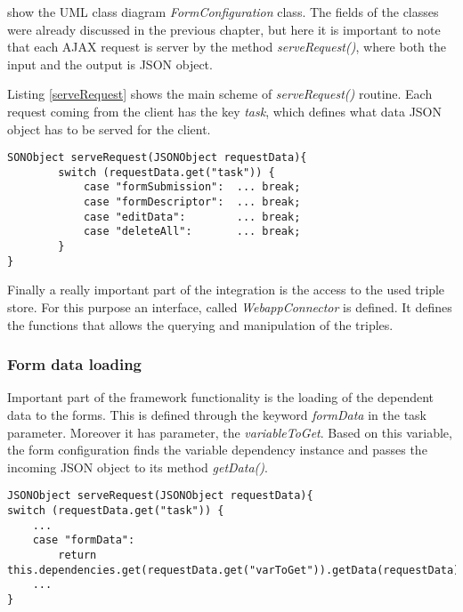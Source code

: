 

 show the UML class diagram \textit{FormConfiguration} class. The fields of the classes were already discussed in the previous chapter, but here it is important to note that each AJAX request is server by the method \textit{serveRequest()}, where both the input and the output is JSON object.


Listing \ref{serveRequest} shows the main scheme of \textit{serveRequest()} routine. Each request coming from the client has the key \textit{task}, which defines what data JSON object has to be served for the client. 


\begin{lstlisting}[basicstyle=\footnotesize, frame=single, caption={AJAX request server routine}, label=serveRequest, captionpos=b, belowskip=1em, aboveskip=2em]
SONObject serveRequest(JSONObject requestData){
		switch (requestData.get("task")) {
			case "formSubmission":  ... break;
			case "formDescriptor":  ... break;
			case "editData":		... break;
			case "deleteAll":		... break;
		}
}
\end{lstlisting}


Finally a really important part of the integration is the access to the used triple store. For this purpose an interface, called \textit{WebappConnector} is defined. It defines the functions that allows the querying and manipulation of the triples.



\subsubsection{Form data loading}


Important part of the framework functionality is the loading of the dependent data to the forms. This is defined through the keyword \textit{formData} in the task parameter. Moreover it has parameter, the \textit{variableToGet}. Based on this variable, the form configuration finds the variable dependency instance and passes the incoming JSON object to its method \textit{getData()}.


\begin{lstlisting}[basicstyle=\footnotesize, frame=single, caption={Loading form data from FormConfiguration}, label=serveRequest, captionpos=b, belowskip=1em, aboveskip=2em]
JSONObject serveRequest(JSONObject requestData){
switch (requestData.get("task")) {
	...
	case "formData": 
		return this.dependencies.get(requestData.get("varToGet")).getData(requestData)
	...		
}
\end{lstlisting}


